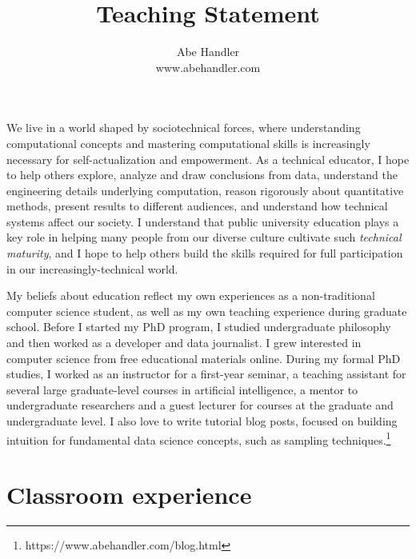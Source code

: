 \documentclass{article}
\title{\vspace{-4cm} \large Teaching Statement}
\author{Abe Handler \\ www.abehandler.com}
\date{\vspace{-.5cm}}
\begin{document}
\maketitle

We live in a world shaped by sociotechnical forces, where understanding computational concepts and mastering computational skills is increasingly necessary for self-actualization and empowerment. As a technical educator, I hope to help others explore, analyze and draw conclusions from data, understand the engineering details underlying computation, reason rigorously about quantitative methods, present results to different audiences, and understand how technical systems affect our society. I understand that public university education plays a key role in helping many people from our diverse culture cultivate such \textit{technical maturity}, and I hope to help others build the skills required for full participation in our increasingly-technical world.

My beliefs about education reflect my own experiences as a non-traditional computer science student, as well as my own teaching experience during graduate school. Before I started my PhD program, I studied undergraduate philosophy and then worked as a developer and data journalist. I grew interested in computer science from free educational materials online. During my formal PhD studies, I worked as an instructor for a first-year seminar, a teaching assistant for several large graduate-level courses in artificial intelligence, a mentor to undergraduate researchers and a guest lecturer for courses at the graduate and undergraduate level. I also love to write tutorial blog posts, focused on building intuition for fundamental data science concepts, such as sampling techniques.\footnote{https://www.abehandler.com/blog.html}





\section*{\normalsize Classroom experience}
\end{document}
